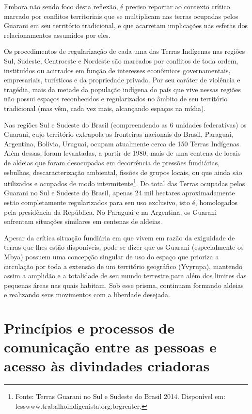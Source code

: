 Embora não sendo foco desta reflexão, é preciso reportar ao contexto
crítico marcado por conflitos territoriais que se multiplicam nas
terras ocupadas pelos Guarani em seu território tradicional, e que
acarretam implicações nas esferas dos relacionamentos assumidos por
eles. 

Os procedimentos de regularização de cada uma das Terras Indígenas nas
regiões Sul, Sudeste, Centroeste e Nordeste são marcados por conflitos
de toda ordem, instituídos ou acirrados em função de interesses
econômicos governamentais, empresariais, turísticos e da propriedade
privada. Por seu caráter de violência e tragédia, mais da metade da
população indígena do país que vive nessas regiões não possui espaços
reconhecidos e regularizados no âmbito de seu território tradicional
(mas vêm, cada vez mais, alcançando espaços na mídia). 

Nas regiões Sul e Sudeste do Brasil (compreendendo as 6 unidades
federativas) os Guarani, cujo território extrapola as fronteiras
nacionais do Brasil, Paraguai, Argentina, Bolívia, Uruguai, ocupam
atualmente cerca de 150 Terras Indígenas. Além dessas, foram
levantadas, a partir de 1980, mais de uma centena de locais de aldeias
que foram desocupadas em decorrência de pressões fundiárias, esbulhos,
descaracterização ambiental, fissões de grupos locais, ou que ainda são
utilizados e ocupados de modo intermitente\footnote{Fonte: Terras
Guarani no Sul e Sudeste do Brasil 2014. Disponível em:
{less}www.trabalhoindigenista.org.br{greater}.}. Do total das
Terras ocupadas pelos Guarani no Sul e Sudeste do Brasil, apenas 24 mil
hectares aproximadamente estão completamente regularizados para seu uso
exclusivo, isto é, homologados pela presidência da República. No
Paraguai e na Argentina, os Guarani enfrentam situações similares em
centenas de aldeias. 

Apesar da crítica situação fundiária em que vivem em razão da exiguidade
de terras que lhes estão disponíveis, pode-se dizer que os Guarani
(especialmente os Mbya) possuem uma concepção singular de uso do espaço
que prioriza a circulação por toda a extensão de um território
geográfico (Yvyrupa), mantendo assim a amplidão e a totalidade de seu
mundo terrestre para além dos limites das pequenas áreas nas quais
habitam. Sob esse prisma, continuam formando aldeias e realizando seus
movimentos com a liberdade desejada.  

\section{Princípios e processos de comunicação entre as pessoas e acesso às
divindades criadoras} 

